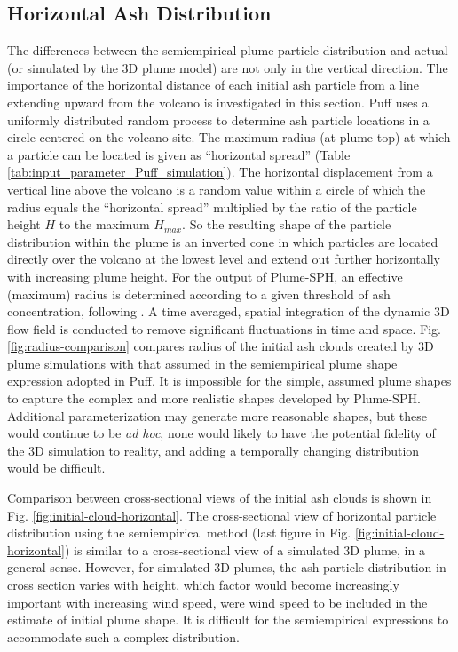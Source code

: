 \documentclass[utf8]{frontiersSCNS} %
\begin{document}
\subsection{Horizontal Ash Distribution}

The differences between the semiempirical plume particle distribution and actual (or simulated by the 3D plume model) are not only in the vertical direction. The importance of the horizontal distance of each initial ash particle from a line extending upward from the volcano is investigated in this section. Puff uses a uniformly distributed random process to determine ash particle locations in a circle centered on the volcano site. The maximum radius (at plume top) at which a particle can be located is given as ``horizontal spread'' (Table \ref{tab:input_parameter_Puff_simulation}). The horizontal displacement from a vertical line above the volcano is a random value within a circle of which the radius equals the ``horizontal spread'' multiplied by the ratio of the particle height $H$ to the maximum $H_{max}$. So the resulting shape of the particle distribution within the plume is an inverted cone in which particles are located directly over the volcano at the lowest level and extend out further horizontally with increasing plume height. For the output of Plume-SPH, an effective (maximum) radius is determined according to a given threshold of ash concentration, following \citet {cerminara2016large}. A time averaged, spatial integration of the dynamic 3D flow field is conducted to remove significant fluctuations in time and space. Fig. \ref{fig:radius-comparison} compares radius of the initial ash clouds created by 3D plume simulations with that assumed in the semiempirical plume shape expression adopted in Puff. It is impossible for the simple, assumed plume shapes to capture the complex and more realistic shapes developed by  Plume-SPH. Additional parameterization may generate more reasonable shapes, but these would continue to be \textit{ad hoc}, none would likely to have the potential fidelity of the 3D simulation to reality, and adding a temporally changing distribution would be difficult.

Comparison between cross-sectional views of the initial ash clouds is shown in Fig. \ref{fig:initial-cloud-horizontal}. The cross-sectional view of horizontal particle distribution using the semiempirical method (last figure in Fig. \ref{fig:initial-cloud-horizontal}) is similar to a cross-sectional view of a simulated 3D plume, in a general sense. However, for simulated 3D plumes, the ash particle distribution in cross section varies with height, which factor would become increasingly important with increasing wind speed, were wind speed to be included in the estimate of initial plume shape. It is difficult for the semiempirical expressions to accommodate such a complex distribution.
\end{document}
